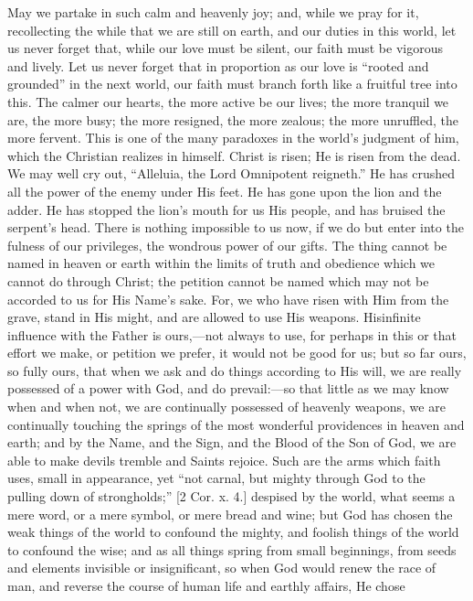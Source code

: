 May we partake in such calm and heavenly joy; and, while we pray
for it, recollecting the while that we are still on earth, and our
duties in this world, let us never forget that, while our love must be
silent, our faith must be vigorous and lively. Let us never forget
that in proportion as our love is ``rooted and grounded'' in
the next world, our faith must branch forth like a fruitful tree into
this. The calmer our hearts, the more active be our lives; the more
tranquil we are, the more busy; the more resigned, the more zealous;
the more unruffled, the more fervent. This is one of the many
paradoxes in the world's judgment of him, which the Christian
realizes in himself. Christ is risen; He is risen from the dead. We
may well cry out, ``Alleluia, the Lord Omnipotent reigneth.''
He has crushed all the power of the enemy under His feet. He has gone
upon the lion and the adder. He has stopped the lion's mouth for us
His people, and has bruised the serpent's head. There is nothing
impossible to us now, if we do but enter into the fulness of our
privileges, the wondrous power of our gifts. The thing cannot be named
in heaven or earth within the limits of truth and obedience which we
cannot do through Christ; the petition cannot be named which may not
be accorded to us for His Name's sake. For, we who have risen with
Him from the grave, stand in His might, and are allowed to use His
weapons. His\emph{}infinite influence with the Father is ours,—not
always to use, for perhaps in this or that effort we make, or petition
we prefer, it would not be good for us; but so far ours, so fully
ours, that when we ask and do things according to His will, we are
really possessed of a power with God, and do prevail:—so that little
as we may know when and when not, we are continually possessed of
heavenly weapons, we are continually touching the springs of the most
wonderful providences in heaven and earth; and by the Name, and the
Sign, and the Blood of the Son of God, we are able to make devils
tremble and Saints rejoice. Such are the arms which faith uses, small
in appearance, yet ``not carnal, but mighty through God to the
pulling down of strongholds;'' [2 Cor. x. 4.] despised by the
world, what seems a mere word, or a mere symbol, or mere bread and
wine; but God has chosen the weak things of the world to confound the
mighty, and foolish things of the world to confound the wise; and as
all things spring from small beginnings, from seeds and elements
invisible or insignificant, so when God would renew the race of man,
and reverse the course of human life and earthly affairs, He chose
